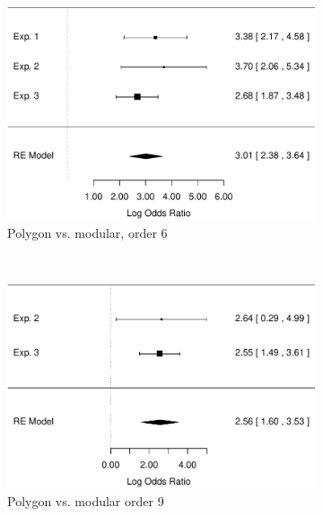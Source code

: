 \documentclass[man,mask,10pt]{apa6}
\begin{document}
\begin{figure}
\centering
\begin{subfigure}[c]{0.4\textwidth}
\centering
\includegraphics[width=\textwidth]{figures/meta/question_typeinverse_zero_6_conditionpolygon.pdf}
\caption{Polygon vs. modular, order 6}
\end{subfigure}
~
\begin{subfigure}[c]{0.4\textwidth}
\centering
\includegraphics[width=\textwidth]{figures/meta/question_typeinverse_zero_9_conditionpolygon.pdf}
\caption{Polygon vs. modular order 9}
\end{subfigure} \\
\centering
\begin{subfigure}[c]{0.4\textwidth}
\centering

\end{subfigure}
\end{figure}
\end{document}
